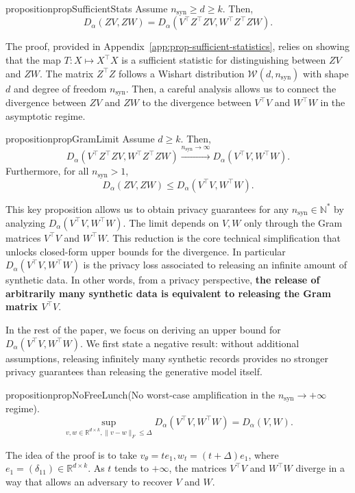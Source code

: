 \documentclass{article}
\theoremstyle{plain}
\theoremstyle{definition}
\theoremstyle{remark}
\begin{document}
\begin{restatable}{proposition}{propSufficientStats}
\label{prop:sufficient-statistics}
    Assume $n_{\mathrm{syn}}\geq d\geq k$. Then,
    \[D_\alpha(ZV,ZW) = D_\alpha(V^\top Z^\top Z V, W^\top Z^\top Z W).\]
\end{restatable}
The proof, provided in Appendix~\ref{app:prop-sufficient-statistics}, relies on showing that the map $T : X \mapsto X^\top X$ is a sufficient statistic for distinguishing between $ZV$ and $ZW$. The matrix $Z^\top Z$ follows a Wishart distribution $\mathcal{W}(d,n_{\mathrm{syn}})$ with shape $d$ and degree of freedom $n_{\mathrm{syn}}$. Then, a careful analysis allows us to connect the divergence between $ZV$ and $ZW$ to the divergence between $V^\top V$ and $W^\top W$ in the asymptotic regime.

\begin{restatable}{proposition}{propGramLimit}
\label{prop:gram-limit}
    Assume $d \geq k$. Then,
    \[D_\alpha(V^\top Z^\top Z V, W^\top Z^\top Z W) \overset{n_{\mathrm{syn}}\to \infty}{\longrightarrow} D_\alpha(V^\top V, W^\top  W).\]
    Furthermore, for all $n_{\mathrm{syn}}> 1$, \[D_\alpha(ZV,ZW) \leq D_\alpha(V^\top V, W^\top  W).\]
\end{restatable}

This key proposition allows us to obtain privacy guarantees for any $n_{\mathrm{syn}} \in \mathbb{N}^*$ by analyzing $D_\alpha(V^\top V, W^\top  W)$. The limit depends on $V,W$ only through the Gram matrices $V^\top V$ and $W^\top W$. This reduction is the core technical simplification that unlocks closed-form upper bounds for the divergence. In particular $D_\alpha(V^\top V, W^\top  W)$ is the privacy loss associated to releasing an infinite amount of synthetic data. In other words, from a privacy perspective, \textbf{the release of arbitrarily many synthetic data is equivalent to releasing the Gram matrix $V^\top V$}. 

In the rest of the paper, we focus on deriving an upper bound for $D_\alpha(V^\top V, W^\top  W)$.
We first state a negative result: without additional assumptions, releasing infinitely many synthetic records provides no stronger privacy guarantees than releasing the generative model itself.

\begin{restatable}{proposition}{propNoFreeLunch}{\normalfont (No worst-case amplification in the $n_{\mathrm{syn}} \to + \infty$ regime).}
\label{prop:nofreelunch}
    \[\sup_{v,w \in \mathbb{R}^{d \times k}, \|v-w\|_F \leq \Delta}D_\alpha(V^\top V, W^\top  W) = D_\alpha(V,W).\]
\end{restatable}
The idea of the proof is to take $v_\theta = t e_1, w_t = (t + \Delta)e_1$, where $e_1 = (\delta_{11}) \in \mathbb{R}^{d\times k}$. As $t$ tends to $+\infty$, the matrices $V^\top V$ and $W^\top W$ diverge in a way that allows an adversary to recover $V$ and $W$.
\end{document}
